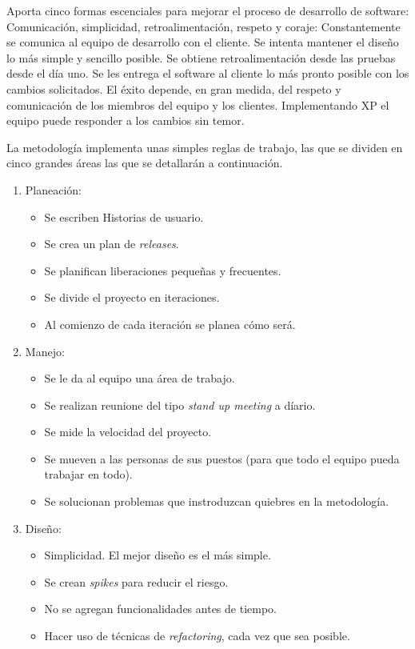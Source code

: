Aporta cinco formas escenciales para mejorar el proceso de desarrollo de software: Comunicación, simplicidad, retroalimentación, respeto y coraje: Constantemente se comunica al equipo de desarrollo con el cliente. Se intenta mantener el diseño lo más simple y sencillo posible. Se obtiene retroalimentación desde las pruebas desde el día uno. Se les entrega el software al cliente lo más pronto posible con los cambios solicitados. El éxito depende, en gran medida, del respeto y comunicación de los miembros del equipo y los clientes. Implementando XP el equipo puede responder a los cambios sin temor.

La metodología implementa unas simples reglas de trabajo, las que se dividen en cinco grandes áreas las que se detallarán a continuación.

\begin{enumerate}
\item Planeación:
	\begin{itemize}
	\item Se escriben Historias de usuario. 
	\item Se crea un plan de \textit{releases}.
	\item Se planifican liberaciones pequeñas y frecuentes.
	\item Se divide el proyecto en iteraciones.
	\item Al comienzo de cada iteración se planea cómo será.
	\end{itemize}
\item Manejo:
	\begin{itemize}
	\item Se le da al equipo una área de trabajo.
	\item Se realizan reunione del tipo \textit{stand up meeting} a díario.
	\item Se mide la velocidad del proyecto. 
	\item Se mueven a las personas de sus puestos (para que todo el equipo pueda trabajar en todo).
	\item Se solucionan problemas que instroduzcan quiebres en la metodología.
	\end{itemize}
\item Diseño:
	\begin{itemize}
	\item Simplicidad. El mejor diseño es el más simple.
	\item Se crean \textit{spikes} para reducir el riesgo.
	\item No se agregan funcionalidades antes de tiempo.
	\item Hacer uso de técnicas de \textit{refactoring}, cada vez que sea posible.

\end{itemize}
\end{enumerate}
